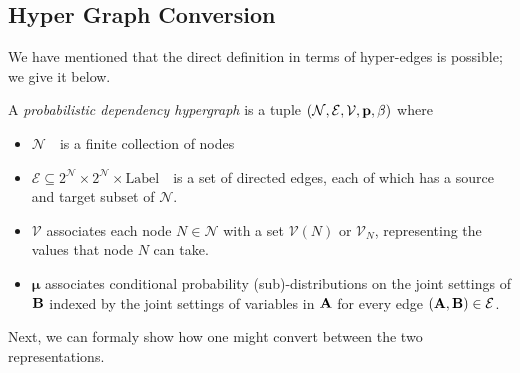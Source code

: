 \documentclass{article}
\theoremstyle{plain}
\theoremstyle{definition}
\theoremstyle{remark}
\newcommand{\note}[1]{{\color{blue}\ \!\Large\smash{\textbf{[}}{\normalsize\textsc{note:} #1}\ \!\smash{\textbf{]}}}}
\newcommand{\bmu}{\boldsymbol{\mu}}
\newcommand{\V}{\mathcal V}
\newcommand{\N}{\mathcal N}
\newcommand{\Ed}{\mathcal E}
\newcommand{\modelnamehyper}{probabilistic dependency hypergraph}
\newcommand{\MNH}{PDH}
\numberwithin{equation}{section}
\begin{document}
	\subsection{Hyper Graph Conversion}\label{sec:hyper-convert}
	We have mentioned that the direct definition in terms of hyper-edges is possible; we give it below.
	
	\begin{defn}[\MNH]\label{def:hypermodel}
		A \emph{\modelnamehyper} is a tuple $\mnvars[]$ where
		\begin{itemize}[nosep]
			\item $\N$~~is a finite collection of nodes
			\item $\Ed \subseteq 2^{\N} \times 2^{\N} \times \mathrm{Label}$~~is a set of directed edges, each of which has a source and target subset of $\N$.
			\item $\V$ associates each node $N \in \mathcal N$ with a set $\V(N)$ or $\V_N$, representing the values that node $N$ can take.
			\item $\bmu$
			associates conditional probability (sub)-distributions on the joint settings of $\bf B$ indexed by the joint settings of variables in $\bf A$ for every edge $({\bf A,B}) \in \Ed$. %
		\end{itemize}
	\end{defn}
	
	Next, we can formaly show how one might convert between the two representations.
		
\end{document}
